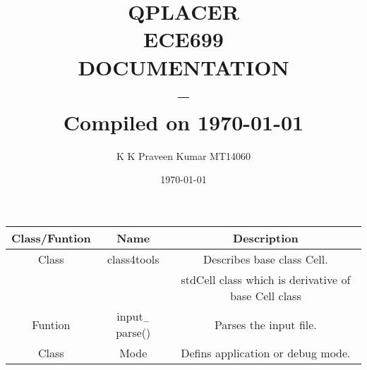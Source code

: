 \documentclass[a4paper]{article}
\title{\huge \vspace{50mm} QPLACER \vspace{5mm}\\ \huge ECE699 \vspace{90mm}\\ \huge DOCUMENTATION\\ -- \\ \small Compiled on \today \\ \currenttime}
\author{K K Praveen Kumar   MT14060}
\date{\today}
\begin{document}
\maketitle
\thispagestyle{empty}




\newpage

\par 
\begin{tabular}{| c | c | c |}
\hline
Class/Funtion & Name & Description \\
\hline
Class & class4tools & Describes base class Cell. \\
& & stdCell class which is derivative of base Cell class \\
\hline
Funtion & input$_{-}$parse() & Parses the input file.\\
\hline
Class & Mode & Defins application or debug mode.\\
\hline
\end{tabular}
\end{document}
